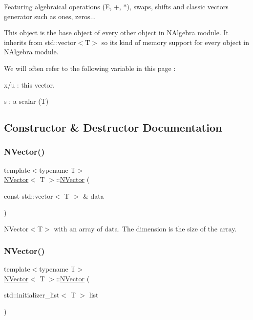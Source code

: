 Featuring algebraical operations (E, +, $\ast$), swaps, shifts and classic vectors generator such as ones, zeros...

This object is the base object of every other object in N\+Algebra module. It inherits from std\+::vector$<$\+T$>$ so it\textquotesingle{}s kind of memory support for every object in N\+Algebra module.

We will often refer to the following variable in this page \+:
\begin{DoxyItemize}
\item x/u \+: this vector.
\item s \+: a scalar (T) 
\end{DoxyItemize}

\subsection{Constructor \& Destructor Documentation}
\mbox{\label{class_n_vector_a786957fb5d1d9bdec7e6ced65bce03c0}} 
\subsubsection{\texorpdfstring{NVector()}{NVector()}\hspace{0.1cm}{\footnotesize\ttfamily [1/5]}}
{\footnotesize\ttfamily template$<$typename T$>$ \\
\mbox{\hyperlink{class_n_vector}{N\+Vector}}$<$ T $>$\+::\mbox{\hyperlink{class_n_vector}{N\+Vector}} (\begin{DoxyParamCaption}\item[{const std\+::vector$<$ T $>$ \&}]{data }\end{DoxyParamCaption})\hspace{0.3cm}{\ttfamily [inline]}}



N\+Vector$<$\+T$>$ with an array of data. The dimension is the size of the array. 

\mbox{\label{class_n_vector_a44c7b132c668c2aac890b66fe7ab0262}} 
\subsubsection{\texorpdfstring{NVector()}{NVector()}\hspace{0.1cm}{\footnotesize\ttfamily [2/5]}}
{\footnotesize\ttfamily template$<$typename T$>$ \\
\mbox{\hyperlink{class_n_vector}{N\+Vector}}$<$ T $>$\+::\mbox{\hyperlink{class_n_vector}{N\+Vector}} (\begin{DoxyParamCaption}\item[{std\+::initializer\+\_\+list$<$ T $>$}]{list }\end{DoxyParamCaption})\hspace{0.3cm}{\ttfamily [inline]}}

